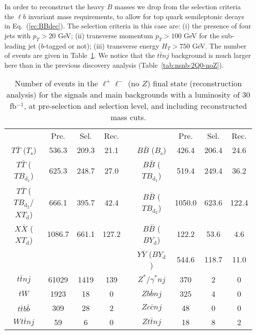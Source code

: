 \documentclass[12pt,a4paper]{article}
\newcommand{\TT}{T \bar T}
\newcommand{\BB}{B \bar B}
\newcommand{\XX}{X \bar X}
\newcommand{\YY}{Y \bar Y}
\newcommand{\Ts}{T_\text{s}}
\newcommand{\Bs}{B_\text{s}}
\newcommand{\TBd}{TB_{\text{d}_1}}
\newcommand{\TBD}{TB_{\text{d}_2}}
\newcommand{\XTd}{XT_\text{d}}
\newcommand{\BYd}{BY_\text{d}}
\begin{document}
In order to reconstruct the heavy $B$ masses we drop from the selection criteria the $\ell b$ invariant mass requirements, to allow for top quark semileptonic decays in Eq.~(\ref{ec:BBdec}).
The selection 
criteria in this case are:
(i) the presence of four jets with $p_T > 20$ GeV;
(ii) transverse momentum $p_T > 100$ GeV for the sub-leading jet ($b$-tagged or not);
(iii) transverse energy $H_T > 750$ GeV.
The number of events are given in Table~\ref{tab:nsnb-2Q0-noZ-2}. We notice that the $t \bar t nj$ background is much larger here than in the previous discovery analysis (Table~\ref{tab:nsnb-2Q0-noZ}).

\begin{table}[t]
\begin{center}
\begin{tabular}{ccccccccc}
                      & Pre.   & Sel.  & Rec.  & \quad &          & Pre.   & Sel.  & Rec. \\[1mm]
$\TT$ ($\Ts$)         & 536.3  & 209.3 & 21.1  & & $\BB$ ($\Bs$)  & 426.4  & 206.4 & 24.6 \\
$\TT$ ($\TBd$)        & 625.3  & 248.7 & 27.0  & & $\BB$ ($\TBd$) & 519.4  & 249.4 & 36.2 \\
$\TT$ ($\TBD$/$\XTd$) & 666.1  & 395.7 & 42.4  & & $\BB$ ($\TBD$) & 1050.0 & 623.6 & 122.4 \\
$\XX$ ($\XTd$)        & 1086.7 & 661.1 & 127.2 & & $\BB$ ($\BYd$) & 122.2  & 53.6  & 4.6 \\
                      &        &       &       & & $\YY$ ($\BYd$) & 544.6  & 118.7 & 11.0 \\
\hline
$t \bar t nj$         & 61029  & 1419  & 139   & & $Z^*/\gamma^* nj$  & 370    & 2     & 0 \\
$tW$                  & 1923   & 18    & 0     & & $Zb\bar b nj$  & 325    & 4     & 0 \\
$t\bar tb\bar b$      & 309    & 28    & 2     & & $Zc \bar c nj$ & 48     & 0     & 0 \\
$W t \bar t nj$       & 59     & 6     & 0     & & $Zt \bar t nj$ & 18     & 8     & 2
\end{tabular}
\end{center}
\caption{Number of events in the $\ell^+ \ell^-$ (no $Z$) final state (reconstruction analysis) for
the signals and main backgrounds with a luminosity of 30 fb$^{-1}$, at pre-selection and selection level, and including reconstructed mass cuts.}
\label{tab:nsnb-2Q0-noZ-2}
\end{table}
\end{document}
